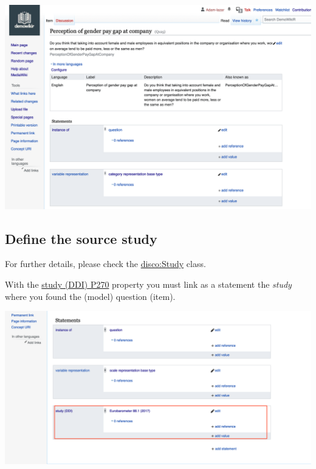 \documentclass[
  letterpaper,
  DIV=11,
  numbers=noendperiod]{scrreprt}
\begin{document}
\begin{center}
\includegraphics{png/question_to_wikibase/VariableRepresentation_6x4.png}
\end{center}

\subsection{Define the source study}\label{define-the-source-study}

\begin{tcolorbox}[enhanced jigsaw, opacityback=0, bottomrule=.15mm, rightrule=.15mm, toptitle=1mm, breakable, colbacktitle=quarto-callout-tip-color!10!white, colback=white, title=\textcolor{quarto-callout-tip-color}{\faLightbulb}\hspace{0.5em}{Tip}, leftrule=.75mm, toprule=.15mm, left=2mm, arc=.35mm, colframe=quarto-callout-tip-color-frame, coltitle=black, titlerule=0mm, bottomtitle=1mm, opacitybacktitle=0.6]

For further details, please check the
\href{https://rdf-vocabulary.ddialliance.org/discovery.html\#study}{disco:Study}
class.

\end{tcolorbox}

With the
\href{https://reprexbase.eu/demowiki/index.php?title=Property:P270}{study
(DDI) P270} property you must link as a statement the \emph{study} where
you found the (model) question (item).

\begin{center}
\includegraphics{png/question_to_wikibase/statement_study_2x1.png}
\end{center}
\end{document}
